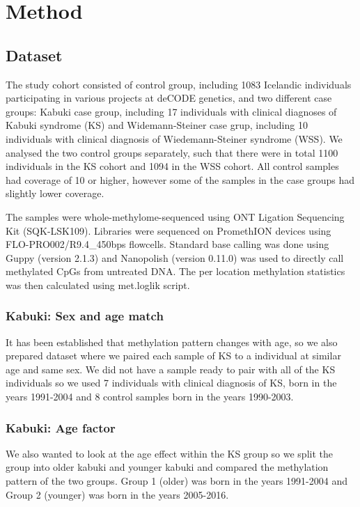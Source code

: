 \chapter{Method}
\section{Dataset}
\label{section:method:dataset}
The study cohort consisted of control group, including 1083 Icelandic individuals participating in various projects at deCODE genetics, and two different case groups: Kabuki case group, including 17 individuals with clinical diagnoses of Kabuki syndrome (KS) and Widemann-Steiner case grup, including 10 individuals with clinical diagnosis of Wiedemann-Steiner syndrome (WSS). We analysed the two control groups separately,
such that there were in total 1100 individuals in the KS cohort and 1094 in the WSS
cohort. All control samples had coverage of 10 or higher, however some of the samples in the case groups had slightly lower coverage. 

The samples were whole-methylome-sequenced
using ONT Ligation Sequencing Kit (SQK-LSK109). Libraries were sequenced on PromethION devices using FLO-PRO002/R9.4\_450bps flowcells. Standard base calling was done using Guppy (version 2.1.3) and Nanopolish (version 0.11.0) was used to directly call methylated CpGs from untreated DNA. The per location methylation statistics was then calculated using met.loglik script.

\subsection{Kabuki: Sex and age match}
It has been established that methylation pattern changes with age, so we also prepared dataset where we paired each sample of KS to a individual at similar age and same sex. We did not have a sample ready to pair with all of the KS individuals so we used 7 individuals with clinical diagnosis of KS, born in the years 1991-2004 and 8 control samples born in the years 1990-2003. 

\subsection{Kabuki: Age factor}
We also wanted to look at the age effect within the KS group so we split the group into older kabuki and younger kabuki and compared the methylation pattern of the two groups. Group 1 (older) was born in the years 1991-2004 and Group 2 (younger) was born in the years 2005-2016.

